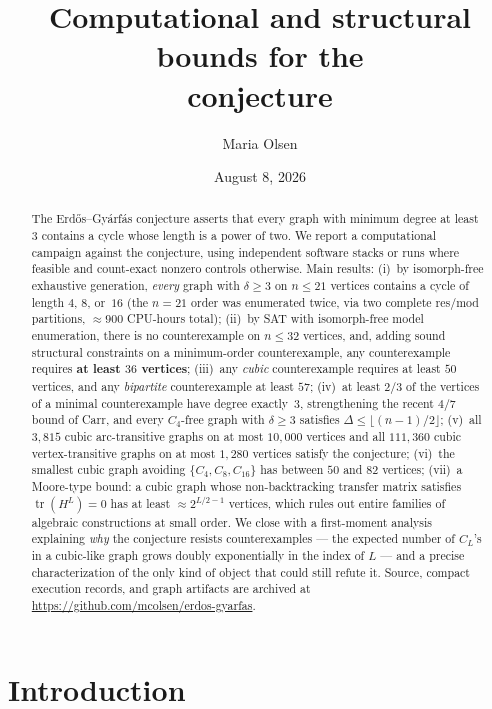 \documentclass[11pt]{article}
\title{Computational and structural bounds for the\\ \EG{} conjecture}
\author{Maria Olsen}
\date{August 8, 2026}
\theoremstyle{remark}
\newcommand{\EG}{Erd\H{o}s--Gy\'arf\'as}
\newcommand{\repourl}{\url{https://github.com/mcolsen/erdos-gyarfas}}
\newcommand{\Cyc}[1]{C_{#1}}
\begin{document}
\maketitle

\begin{abstract}
The \EG{} conjecture asserts that every graph with minimum degree at least~$3$
contains a cycle whose length is a power of two. We report a computational
campaign against the conjecture, using independent software stacks or runs
where feasible and count-exact nonzero controls otherwise. Main
results: (i)~by isomorph-free exhaustive generation, \emph{every} graph with
$\delta \ge 3$ on $n \le 21$ vertices contains a cycle of length $4$, $8$,
or~$16$ (the $n=21$ order was enumerated twice, via two complete
res/mod partitions, $\approx 900$ CPU-hours total); (ii)~by SAT with
isomorph-free model enumeration, there is no counterexample on $n \le 32$
vertices, and, adding sound structural constraints on a minimum-order
counterexample, any counterexample requires \textbf{at least $36$ vertices};
(iii)~any \emph{cubic} counterexample requires at least $50$ vertices, and any
\emph{bipartite} counterexample at least $57$; (iv)~at least $2/3$ of the
vertices of a minimal counterexample have degree exactly~$3$, strengthening
the recent $4/7$ bound of Carr, and every $\Cyc4$-free graph with
$\delta \ge 3$ satisfies $\Delta \le \lfloor (n-1)/2 \rfloor$; (v)~all
$3{,}815$ cubic arc-transitive graphs on at most $10{,}000$ vertices and all
$111{,}360$ cubic vertex-transitive graphs on at most $1{,}280$ vertices
satisfy the conjecture; (vi)~the smallest cubic graph avoiding
$\{\Cyc4,\Cyc8,\Cyc{16}\}$ has between $50$ and $82$ vertices; (vii)~a
Moore-type bound: a cubic graph whose non-backtracking transfer matrix
satisfies $\operatorname{tr}(H^L)=0$ has at least $\approx 2^{L/2-1}$
vertices, which rules out entire families of algebraic constructions at small
order. We close with a first-moment analysis explaining \emph{why} the
conjecture resists counterexamples --- the expected number of $\Cyc L$'s in a
cubic-like graph grows doubly exponentially in the index of $L$ --- and a
precise characterization of the only kind of object that could still refute
it. Source, compact execution records, and graph artifacts are archived at
\repourl.
\end{abstract}

\section{Introduction}
\end{document}
